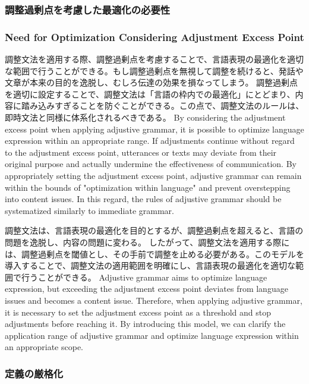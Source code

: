 \documentclass[a4paper,xelatex,ja=standard]{bxjsarticle}
\begin{document}
\ifJPN
\subsubsection{調整過剰点を考慮した最適化の必要性}
\else
  \subsubsection{Need for Optimization Considering Adjustment Excess Point}
\fi

\ifJPN
調整文法を適用する際、調整過剰点を考慮することで、言語表現の最適化を適切な範囲で行うことができる。もし調整過剰点を無視して調整を続けると、発話や文章が本来の目的を逸脱し、むしろ伝達の効果を損なってしまう。
調整過剰点を適切に設定することで、調整文法は「言語の枠内での最適化」にとどまり、内容に踏み込みすぎることを防ぐことができる。この点で、調整文法のルールは、即時文法と同様に体系化されるべきである。
\else
  By considering the adjustment excess point when applying adjustive grammar, it is possible to optimize language expression within an appropriate range. If adjustments continue without regard to the adjustment excess point, utterances or texts may deviate from their original purpose and actually undermine the effectiveness of communication.
By appropriately setting the adjustment excess point, adjustive grammar can remain within the bounds of "optimization within language" and prevent overstepping into content issues. In this regard, the rules of adjustive grammar should be systematized similarly to immediate grammar.
\fi

\ifJPN
調整文法は、言語表現の最適化を目的とするが、調整過剰点を超えると、言語の問題を逸脱し、内容の問題に変わる。
したがって、調整文法を適用する際には、調整過剰点を閾値とし、その手前で調整を止める必要がある。このモデルを導入することで、調整文法の適用範囲を明確にし、言語表現の最適化を適切な範囲で行うことができる。
\else
  Adjustive grammar aims to optimize language expression, but exceeding the adjustment excess point deviates from language issues and becomes a content issue.
  Therefore, when applying adjustive grammar, it is necessary to set the adjustment excess point as a threshold and stop adjustments before reaching it. By introducing this model, we can clarify the application range of adjustive grammar and optimize language expression within an appropriate scope.
\fi

\ifJPN
\subsubsection{定義の厳格化}
\else
\end{document}
